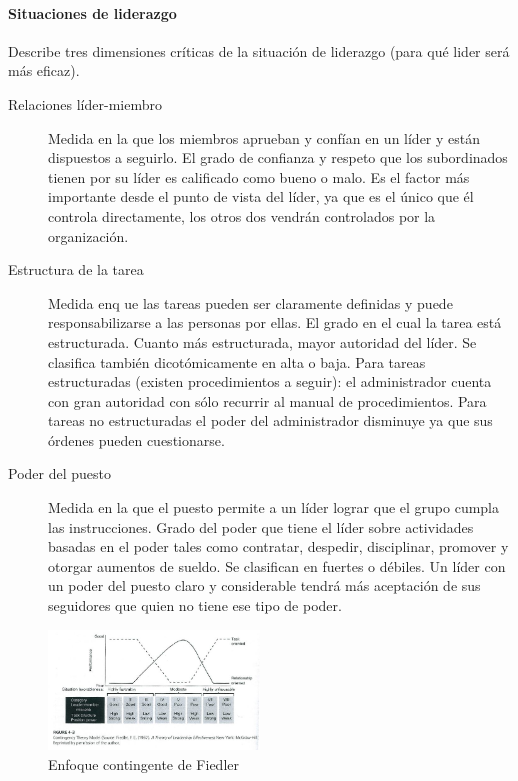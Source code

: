 \documentclass[12pt]{article}
\theoremstyle{definition_wo_parentheses}
\begin{document}
	\paragraph{Situaciones de liderazgo} Describe tres dimensiones críticas de la situación de liderazgo (para qué lider será más eficaz).
	
	\begin{description}
	\item[Relaciones líder-miembro] Medida en la que los miembros aprueban y confían en un líder y están dispuestos a seguirlo. El grado de confianza y respeto que los subordinados tienen por su líder es calificado como bueno o malo. Es el factor más importante desde el punto de vista del líder, ya que es el único que él controla directamente, los otros dos vendrán controlados por la organización.
	\item[Estructura de la tarea] Medida enq ue las tareas pueden ser claramente definidas y puede responsabilizarse a las personas por ellas. El grado en el cual la tarea está estructurada. Cuanto más estructurada, mayor autoridad del líder. Se clasifica también dicotómicamente en alta o baja. Para tareas estructuradas (existen procedimientos a seguir): el administrador cuenta con gran autoridad con sólo recurrir al manual de procedimientos. Para tareas no estructuradas el poder del administrador disminuye ya que sus órdenes pueden cuestionarse.
	\item[Poder del puesto] Medida en la que el puesto permite a un líder lograr que el grupo cumpla las instrucciones. Grado del poder que tiene el líder sobre actividades basadas en el poder tales como contratar, despedir, disciplinar, promover y otorgar aumentos de sueldo. Se clasifican en fuertes o débiles. Un líder con un poder del puesto claro y considerable tendrá más aceptación de sus seguidores que quien no tiene ese tipo de poder.
	\end{description}
	
\begin{figure}[H]
 \centering
 \includegraphics[width=0.5\textwidth]{fiedler}
 \caption{Enfoque contingente de Fiedler}
\end{figure}
\end{document}

